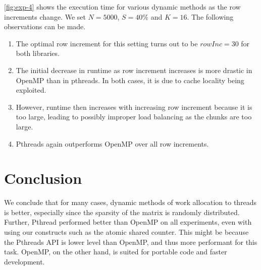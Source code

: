 \documentclass[conference,compsoc]{IEEEtran}
\begin{document}
\autoref{fig:exp-4} shows the execution time for various dynamic methods as the
row increments change. We set \(N = 5000\), \(S = 40\%\) and \(K = 16\). The
following observations can be made.

\begin{enumerate}
    \item The optimal row increment for this setting turns out to be \(rowInc =
    30\) for both libraries.
    \item The initial decrease in runtime as row increment increases is more
    drastic in OpenMP than in pthreads. In both cases, it is due to cache
    locality being exploited.
    \item However, runtime then increases with increasing row increment because
    it is too large, leading to possibly improper load balancing as the chunks
    are too large.
    \item Pthreads again outperforms OpenMP over all row increments.
\end{enumerate}

\section{Conclusion}
\label{sec:conclusion}

We conclude that for many cases, dynamic methods of work allocation to threads
is better, especially since the sparsity of the matrix is randomly distributed.
Further, Pthread performed better than OpenMP on all experiments, even with
using our constructs such as the atomic shared counter. This might be because
the Pthreads API is lower level than OpenMP, and thus more performant for this
task. OpenMP, on the other hand, is suited for portable code and faster
development.
\end{document}
